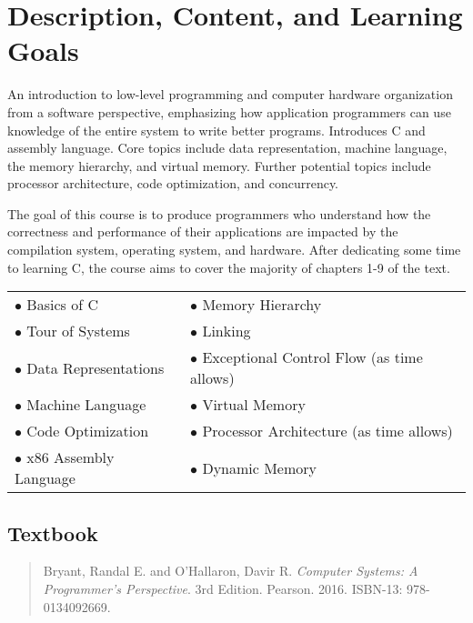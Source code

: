 \documentclass[10pt]{article}
\begin{document}

\section{Description, Content, and Learning Goals}

An introduction to low-level programming and computer hardware
organization from a software perspective, emphasizing how application
programmers can use knowledge of the entire system to write better
programs. Introduces C and assembly language. Core topics include data
representation, machine language, the memory hierarchy, and virtual
memory. Further potential topics include processor architecture, code
optimization, and concurrency.

The goal of this course is to produce programmers who understand how
the correctness and performance of their applications are impacted by
the compilation system, operating system, and hardware. After
dedicating some time to learning C, the course aims to cover the
majority of chapters 1-9 of the text.

\begin{center}
\begin{tabular}{ll}
\(\bullet\) Basics of C & \(\bullet\) Memory Hierarchy\\
\(\bullet\) Tour of Systems & \(\bullet\) Linking\\
\(\bullet\) Data Representations & \(\bullet\) Exceptional Control Flow (as time allows)\\
\(\bullet\) Machine Language & \(\bullet\) Virtual Memory\\
\(\bullet\) Code Optimization & \(\bullet\) Processor Architecture (as time allows)\\
\(\bullet\) x86 Assembly Language & \(\bullet\) Dynamic Memory\\
\end{tabular}
\end{center}

\subsection{Textbook}

\begin{quote}
Bryant, Randal E. and O'Hallaron, Davir R.
\textit{Computer Systems: A Programmer's Perspective}. 3rd Edition. Pearson. 2016. ISBN-13: 978-0134092669.
\end{quote}
\end{document}
